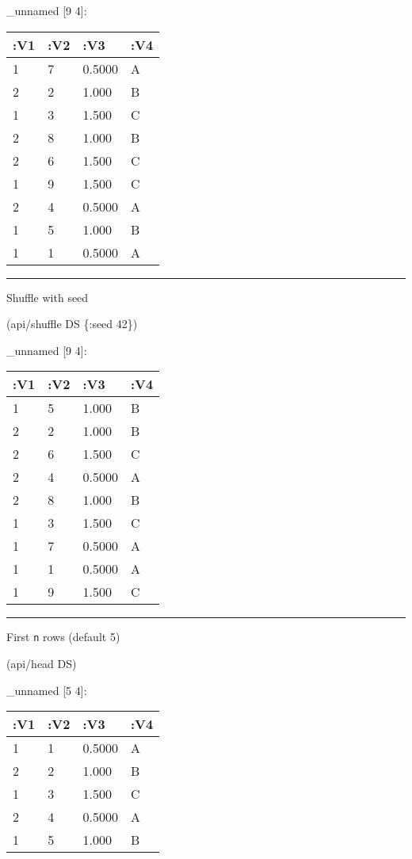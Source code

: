 \documentclass[]{article}
\newenvironment{Shaded}{\begin{snugshade}}{\end{snugshade}}
\newcommand{\DecValTok}[1]{\textcolor[rgb]{0.00,0.00,0.81}{#1}}
\newcommand{\AttributeTok}[1]{\textcolor[rgb]{0.77,0.63,0.00}{#1}}
\newcommand{\NormalTok}[1]{#1}
\begin{document}
\_unnamed {[}9 4{]}:

\begin{longtable}[]{@{}llll@{}}
\toprule
:V1 & :V2 & :V3 & :V4\tabularnewline
\midrule
\endhead
1 & 7 & 0.5000 & A\tabularnewline
2 & 2 & 1.000 & B\tabularnewline
1 & 3 & 1.500 & C\tabularnewline
2 & 8 & 1.000 & B\tabularnewline
2 & 6 & 1.500 & C\tabularnewline
1 & 9 & 1.500 & C\tabularnewline
2 & 4 & 0.5000 & A\tabularnewline
1 & 5 & 1.000 & B\tabularnewline
1 & 1 & 0.5000 & A\tabularnewline
\bottomrule
\end{longtable}

\begin{center}\rule{0.5\linewidth}{0.5pt}\end{center}

Shuffle with seed

\begin{Shaded}
\begin{Highlighting}[]
\NormalTok{(api/shuffle DS \{}\AttributeTok{:seed} \DecValTok{42}\NormalTok{\})}
\end{Highlighting}
\end{Shaded}

\_unnamed {[}9 4{]}:

\begin{longtable}[]{@{}llll@{}}
\toprule
:V1 & :V2 & :V3 & :V4\tabularnewline
\midrule
\endhead
1 & 5 & 1.000 & B\tabularnewline
2 & 2 & 1.000 & B\tabularnewline
2 & 6 & 1.500 & C\tabularnewline
2 & 4 & 0.5000 & A\tabularnewline
2 & 8 & 1.000 & B\tabularnewline
1 & 3 & 1.500 & C\tabularnewline
1 & 7 & 0.5000 & A\tabularnewline
1 & 1 & 0.5000 & A\tabularnewline
1 & 9 & 1.500 & C\tabularnewline
\bottomrule
\end{longtable}

\begin{center}\rule{0.5\linewidth}{0.5pt}\end{center}

First \texttt{n} rows (default 5)

\begin{Shaded}
\begin{Highlighting}[]
\NormalTok{(api/head DS)}
\end{Highlighting}
\end{Shaded}

\_unnamed {[}5 4{]}:

\begin{longtable}[]{@{}llll@{}}
\toprule
:V1 & :V2 & :V3 & :V4\tabularnewline
\midrule
\endhead
1 & 1 & 0.5000 & A\tabularnewline
2 & 2 & 1.000 & B\tabularnewline
1 & 3 & 1.500 & C\tabularnewline
2 & 4 & 0.5000 & A\tabularnewline
1 & 5 & 1.000 & B\tabularnewline
\bottomrule
\end{longtable}
\end{document}
